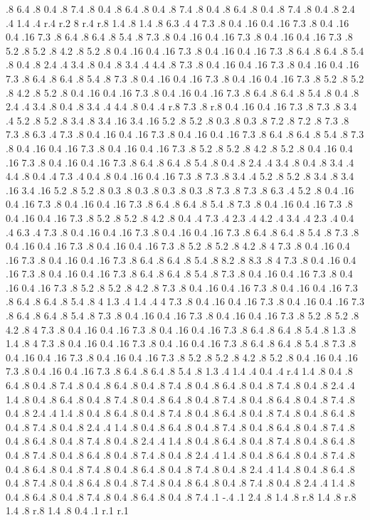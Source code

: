 .8 6.4 .8 0.4 .8 7.4 .8 0.4 .8 6.4 .8 0.4 .8 7.4 .8 0.4 .8 6.4 .8 0.4 .8 7.4 .8 0.4 .8 2.4 .4 1.4 .4 r.4 r.2  8
r.4 r.8 1.4 .8 1.4 .8 6.3 .4  4
7.3 .8 0.4 .16 0.4 .16 7.3 .8 0.4 .16 0.4 .16 7.3 .8 6.4 .8 6.4 .8 5.4 .8 7.3 .8 0.4 .16 0.4 .16 7.3 .8 0.4 .16 0.4 .16 7.3 .8 5.2 .8 5.2 .8 4.2 .8 5.2 .8 0.4 .16 0.4 .16 7.3 .8 0.4 .16 0.4 .16 7.3 .8 6.4 .8 6.4 .8 5.4 .8 0.4 .8 2.4 .4 3.4 .8 0.4 .8 3.4 .4 4.4 .8 7.3 .8 0.4 .16 0.4 .16 7.3 .8 0.4 .16 0.4 .16 7.3 .8 6.4 .8 6.4 .8 5.4 .8 7.3 .8 0.4 .16 0.4 .16 7.3 .8 0.4 .16 0.4 .16 7.3 .8 5.2 .8 5.2 .8 4.2 .8 5.2 .8 0.4 .16 0.4 .16 7.3 .8 0.4 .16 0.4 .16 7.3 .8 6.4 .8 6.4 .8 5.4 .8 0.4 .8 2.4 .4 3.4 .8 0.4 .8 3.4 .4 4.4 .8 0.4 .4 r.8 7.3 .8 r.8 0.4 .16 0.4 .16 7.3 .8 7.3 .8 3.4 .4 5.2 .8 5.2 .8 3.4 .8 3.4 .16 3.4 .16 5.2 .8 5.2 .8 0.3 .8 0.3 .8 7.2 .8 7.2 .8 7.3 .8 7.3 .8 6.3 .4 7.3 .8 0.4 .16 0.4 .16 7.3 .8 0.4 .16 0.4 .16 7.3 .8 6.4 .8 6.4 .8 5.4 .8 7.3 .8 0.4 .16 0.4 .16 7.3 .8 0.4 .16 0.4 .16 7.3 .8 5.2 .8 5.2 .8 4.2 .8 5.2 .8 0.4 .16 0.4 .16 7.3 .8 0.4 .16 0.4 .16 7.3 .8 6.4 .8 6.4 .8 5.4 .8 0.4 .8 2.4 .4 3.4 .8 0.4 .8 3.4 .4 4.4 .8 0.4 .4 7.3 .4 0.4 .8 0.4 .16 0.4 .16 7.3 .8 7.3 .8 3.4 .4 5.2 .8 5.2 .8 3.4 .8 3.4 .16 3.4 .16 5.2 .8 5.2 .8 0.3 .8 0.3 .8 0.3 .8 0.3 .8 7.3 .8 7.3 .8 6.3 .4 5.2 .8 0.4 .16 0.4 .16 7.3 .8 0.4 .16 0.4 .16 7.3 .8 6.4 .8 6.4 .8 5.4 .8 7.3 .8 0.4 .16 0.4 .16 7.3 .8 0.4 .16 0.4 .16 7.3 .8 5.2 .8 5.2 .8 4.2 .8 0.4 .4 7.3 .4 2.3 .4 4.2 .4 3.4 .4 2.3 .4 0.4 .4 6.3 .4 7.3 .8 0.4 .16 0.4 .16 7.3 .8 0.4 .16 0.4 .16 7.3 .8 6.4 .8 6.4 .8 5.4 .8 7.3 .8 0.4 .16 0.4 .16 7.3 .8 0.4 .16 0.4 .16 7.3 .8 5.2 .8 5.2 .8 4.2 .8  4
7.3 .8 0.4 .16 0.4 .16 7.3 .8 0.4 .16 0.4 .16 7.3 .8 6.4 .8 6.4 .8 5.4 .8 8.2 .8 8.3 .8  4
7.3 .8 0.4 .16 0.4 .16 7.3 .8 0.4 .16 0.4 .16 7.3 .8 6.4 .8 6.4 .8 5.4 .8 7.3 .8 0.4 .16 0.4 .16 7.3 .8 0.4 .16 0.4 .16 7.3 .8 5.2 .8 5.2 .8 4.2 .8 7.3 .8 0.4 .16 0.4 .16 7.3 .8 0.4 .16 0.4 .16 7.3 .8 6.4 .8 6.4 .8 5.4 .8  4
1.3 .4 1.4 .4  4
7.3 .8 0.4 .16 0.4 .16 7.3 .8 0.4 .16 0.4 .16 7.3 .8 6.4 .8 6.4 .8 5.4 .8 7.3 .8 0.4 .16 0.4 .16 7.3 .8 0.4 .16 0.4 .16 7.3 .8 5.2 .8 5.2 .8 4.2 .8  4
7.3 .8 0.4 .16 0.4 .16 7.3 .8 0.4 .16 0.4 .16 7.3 .8 6.4 .8 6.4 .8 5.4 .8 1.3 .8 1.4 .8  4
7.3 .8 0.4 .16 0.4 .16 7.3 .8 0.4 .16 0.4 .16 7.3 .8 6.4 .8 6.4 .8 5.4 .8 7.3 .8 0.4 .16 0.4 .16 7.3 .8 0.4 .16 0.4 .16 7.3 .8 5.2 .8 5.2 .8 4.2 .8 5.2 .8 0.4 .16 0.4 .16 7.3 .8 0.4 .16 0.4 .16 7.3 .8 6.4 .8 6.4 .8 5.4 .8 1.3 .4 1.4 .4 0.4 .4 r.4 1.4 .8 0.4 .8 6.4 .8 0.4 .8 7.4 .8 0.4 .8 6.4 .8 0.4 .8 7.4 .8 0.4 .8 6.4 .8 0.4 .8 7.4 .8 0.4 .8 2.4 .4 1.4 .8 0.4 .8 6.4 .8 0.4 .8 7.4 .8 0.4 .8 6.4 .8 0.4 .8 7.4 .8 0.4 .8 6.4 .8 0.4 .8 7.4 .8 0.4 .8 2.4 .4 1.4 .8 0.4 .8 6.4 .8 0.4 .8 7.4 .8 0.4 .8 6.4 .8 0.4 .8 7.4 .8 0.4 .8 6.4 .8 0.4 .8 7.4 .8 0.4 .8 2.4 .4 1.4 .8 0.4 .8 6.4 .8 0.4 .8 7.4 .8 0.4 .8 6.4 .8 0.4 .8 7.4 .8 0.4 .8 6.4 .8 0.4 .8 7.4 .8 0.4 .8 2.4 .4 1.4 .8 0.4 .8 6.4 .8 0.4 .8 7.4 .8 0.4 .8 6.4 .8 0.4 .8 7.4 .8 0.4 .8 6.4 .8 0.4 .8 7.4 .8 0.4 .8 2.4 .4 1.4 .8 0.4 .8 6.4 .8 0.4 .8 7.4 .8 0.4 .8 6.4 .8 0.4 .8 7.4 .8 0.4 .8 6.4 .8 0.4 .8 7.4 .8 0.4 .8 2.4 .4 1.4 .8 0.4 .8 6.4 .8 0.4 .8 7.4 .8 0.4 .8 6.4 .8 0.4 .8 7.4 .8 0.4 .8 6.4 .8 0.4 .8 7.4 .8 0.4 .8 2.4 .4 1.4 .8 0.4 .8 6.4 .8 0.4 .8 7.4 .8 0.4 .8 6.4 .8 0.4 .8 7.4 .1 -.4 .1 2.4 .8 1.4 .8 r.8 1.4 .8 r.8 1.4 .8 r.8 1.4 .8 0.4 .1 r.1 r.1 